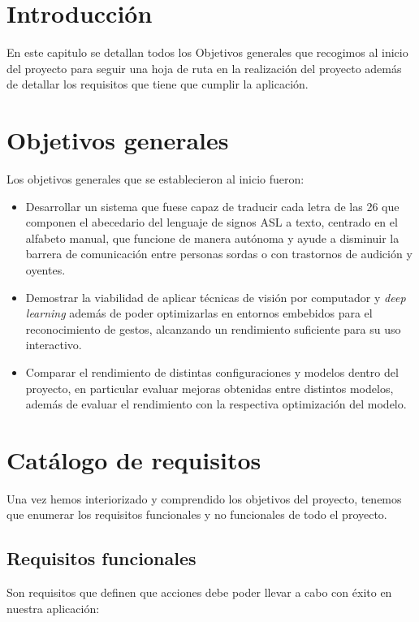 
\section{Introducción}

En este capitulo se detallan todos los Objetivos generales que recogimos al inicio del proyecto para seguir una hoja de ruta en la realización del proyecto además de detallar los requisitos que tiene que cumplir la aplicación.



\section{Objetivos generales}
Los objetivos generales que se establecieron al inicio fueron:

\begin{itemize} 
\tightlist
    \item Desarrollar un sistema que fuese capaz de traducir cada letra de las 26 que componen el abecedario del lenguaje de signos ASL a texto, centrado en el alfabeto manual, que funcione de manera autónoma y ayude a disminuir la barrera de comunicación entre personas sordas o con trastornos de audición y oyentes.

    \item Demostrar la viabilidad de aplicar técnicas de visión por computador y \textit{deep learning} además de poder optimizarlas en entornos embebidos para el reconocimiento de gestos, alcanzando un rendimiento suficiente para su uso interactivo.

    \item Comparar el rendimiento de distintas configuraciones y modelos dentro del proyecto, en particular evaluar mejoras obtenidas entre distintos modelos, además de evaluar el rendimiento con la respectiva optimización del modelo.
\end{itemize}

\section{Catálogo de requisitos}
Una vez hemos interiorizado y comprendido los objetivos del proyecto, tenemos que enumerar los requisitos funcionales y no funcionales de todo el proyecto.

\subsection{Requisitos funcionales}
Son requisitos que definen que acciones debe poder llevar a cabo con éxito en nuestra aplicación:

